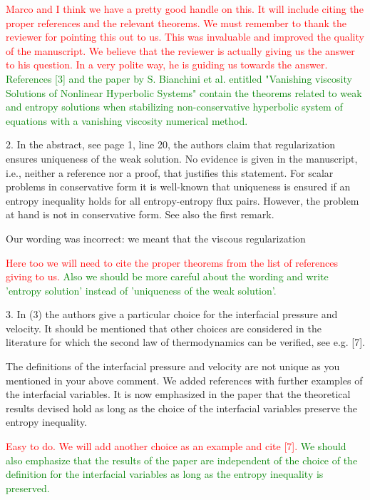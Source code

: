 \documentclass{article}
\newcommand{\tcr}[1]{\textcolor{red}{#1}}
\newcommand{\tcg}[1]{\textcolor{green}{#1}}
\begin{document}
\tcr{Marco and I think we have a pretty good handle on this. It will include
citing the proper references and the relevant theorems. We must remember to thank the reviewer
for pointing this out to us. This was invaluable and improved the quality of the manuscript.
We believe that the reviewer is actually giving us the answer to his question. In a very
polite way, he is guiding us towards the answer.}
\tcg{References [3] and the paper by S. Bianchini et al. entitled "Vanishing viscosity Solutions of Nonlinear Hyperbolic Systems" contain the theorems related to weak and entropy solutions when stabilizing non-conservative hyperbolic system of equations with a vanishing viscosity numerical method.}
\bigskip


{\color{blue}
2. In the abstract, see page 1, line 20, the authors claim that regularization ensures
uniqueness of the weak solution. No evidence is given in the manuscript, i.e., neither
a reference nor a proof, that justifies this statement. For scalar problems in 
conservative form it is well-known that uniqueness is ensured if an entropy inequality
holds for all entropy-entropy flux pairs. However, the problem at hand is not in
conservative form. See also the first remark.}

Our wording was incorrect: we meant that the viscous regularization 

\tcr{Here too we will need to cite the proper theorems from the list of references giving to us.} \tcg{Also we should be more careful about the 
wording and write 'entropy solution' instead of 'uniqueness of the weak solution'.}
\bigskip


{\color{blue}
3. In (3) the authors give a particular choice for the interfacial pressure and velocity.
It should be mentioned that other choices are considered in the literature for which
the second law of thermodynamics can be verified, see e.g. [7].}

The definitions of the interfacial pressure and velocity are not unique as you mentioned in your above comment. We added references with further
examples of the interfacial variables. It is now emphasized in the paper that the theoretical results devised hold as long as the choice of the interfacial
variables preserve the entropy inequality. 

\tcr{Easy to do. We will add another choice as an example and cite [7].} \tcg{We should also emphasize that the
results of the paper are independent of the choice of the definition for the interfacial variables as long as the entropy inequality is preserved.}
\bigskip
\end{document}
